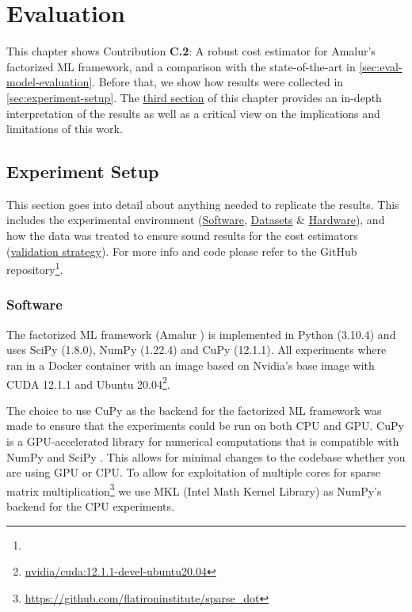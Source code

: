 
\chapter{Evaluation}
\label{chapter:evaluation-discussion}
This chapter shows Contribution \textbf{C.2}: A robust cost estimator for Amalur's factorized ML framework, and a comparison with the state-of-the-art in \autoref{sec:eval-model-evaluation}. Before that, we show how results were collected in \autoref{sec:experiment-setup}. The \hyperref[sec:eval-discussion]{third section} of this chapter provides an in-depth interpretation of the results as well as a critical view on the implications and limitations of this work.

\section{Experiment Setup}
\label{sec:experiment-setup}

This section goes into detail about anything needed to replicate the results. This includes the experimental environment (\hyperref[subsec:6-software]{Software}, \hyperref[subsec:6-datasets]{Datasets} \& \hyperref[subsec:6-hardware]{Hardware}),  and how the data was treated to ensure sound results for the cost estimators (\hyperref[subsec:6-validation-strategy]{validation strategy}). For more info and code please refer to the GitHub repository\footnote{}.

\subsection{Software}
\label{subsec:6-software}
The factorized ML framework (Amalur \cite{amalur}) is implemented in Python (3.10.4) and uses SciPy (1.8.0), NumPy (1.22.4) and CuPy (12.1.1). All experiments where ran in a Docker container with an image based on Nvidia's base image with CUDA 12.1.1 and Ubuntu 20.04\footnote{\href{https://hub.docker.com/layers/nvidia/cuda/12.1.1-devel-ubuntu20.04/images/sha256-5bd13c67a4479a1c13238b470d89a92937ce68ba5f21b930d50c463e3314f657?context=explore}{nvidia/cuda:12.1.1-devel-ubuntu20.04}}.

The choice to use CuPy as the backend for the factorized ML framework was made to ensure that the experiments could be run on both CPU and GPU. CuPy is a GPU-accelerated library for numerical computations that is compatible with NumPy and SciPy \cite{cupy_learningsys2017}. This allows for minimal changes to the codebase whether you are using GPU or CPU. To allow for exploitation of multiple cores for sparse matrix multiplication\footnote{\url{https://github.com/flatironinstitute/sparse_dot}} we use MKL (Intel Math Kernel Library) \cite{intel-mkl} as NumPy's backend for the CPU experiments.

